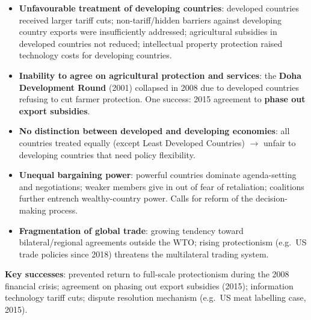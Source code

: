 \documentclass[a4paper,12pt]{article}
\begin{document}
\begin{itemize}
  \item \textbf{Unfavourable treatment of developing countries}: developed countries received larger tariff cuts; non-tariff/hidden barriers against developing country exports were insufficiently addressed; agricultural subsidies in developed countries not reduced; intellectual property protection raised technology costs for developing countries.
  \item \textbf{Inability to agree on agricultural protection and services}: the \textbf{Doha Development Round} (2001) collapsed in 2008 due to developed countries refusing to cut farmer protection. One success: 2015 agreement to \textbf{phase out export subsidies}.
  \item \textbf{No distinction between developed and developing economies}: all countries treated equally (except Least Developed Countries) $\to$ unfair to developing countries that need policy flexibility.
  \item \textbf{Unequal bargaining power}: powerful countries dominate agenda-setting and negotiations; weaker members give in out of fear of retaliation; coalitions further entrench wealthy-country power. Calls for reform of the decision-making process.
  \item \textbf{Fragmentation of global trade}: growing tendency toward bilateral/regional agreements outside the WTO; rising protectionism (e.g.\ US trade policies since 2018) threatens the multilateral trading system.
\end{itemize}
\textbf{Key successes}: prevented return to full-scale protectionism during the 2008 financial crisis; agreement on phasing out export subsidies (2015); information technology tariff cuts; dispute resolution mechanism (e.g.\ US meat labelling case, 2015).
\end{document}
